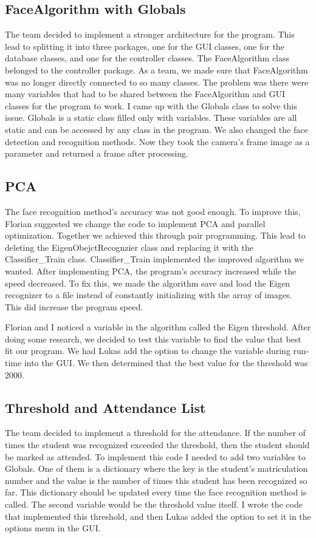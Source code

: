 \documentclass[12pt, a4paper]{article}
\begin{document}
\subsection{FaceAlgorithm with Globals}
The team decided to implement a stronger architecture for the program. This lead to splitting it into three packages, one for the GUI classes, one for the database classes, and one for the controller classes. The FaceAlgorithm class belonged to the controller package. As a team, we made sure that FaceAlgorithm was no longer directly connected to so many classes. The problem was there were many variables that had to be shared between the FaceAlgorithm and GUI classes for the program to work. I came up with the Globals class to solve this issue. Globals is a static class filled only with variables. These variables are all static and can be accessed by any class in the program. We also changed the face detection and recognition methods. Now they took the camera’s frame image as a parameter and returned a frame after processing.

\subsection{PCA}
The face recognition method’s accuracy was not good enough. To improve this, Florian suggested we change the code to implement PCA and parallel optimization. Together we achieved this through pair programming. This lead to deleting the EigenObejctRecognzier class and replacing it with the Classifier\_Train class. Classifier\_Train implemented the improved algorithm we wanted. After implementing PCA, the program’s accuracy increased while the speed decreased. To fix this, we made the algorithm save and load the Eigen recognizer to a file instead of constantly initializing with the array of images. This did increase the program speed.

Florian and I noticed a variable in the algorithm called the Eigen threshold. After doing some research, we decided to test this variable to find the value that best fit our program. We had Lukas add the option to change the variable during run-time into the GUI. We then determined that the best value for the threshold was 2000.

\subsection{Threshold and Attendance List}
The team decided to implement a threshold for the attendance. If the number of times the student was recognized exceeded the threshold, then the student should be marked as attended. To implement this code I needed to add two variables to Globals. One of them is a dictionary where the key is the student’s matriculation number and the value is the number of times this student has been recognized so far. This dictionary should be updated every time the face recognition method is called. The second variable would be the threshold value itself. I wrote the code that implemented this threshold, and then Lukas added the option to set it in the options menu in the GUI.
\end{document}
